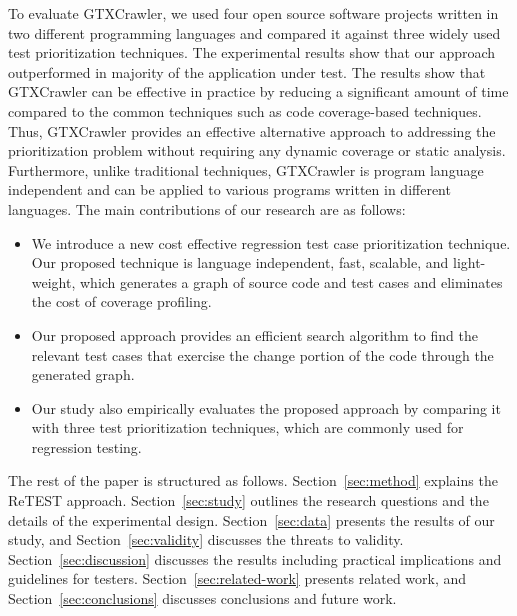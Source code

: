 







To evaluate GTXCrawler, we used four open source software projects
written in two different programming languages
and compared it against three widely used test prioritization techniques. 
The experimental results show that our approach outperformed 
in majority of the application under test.
The results show that GTXCrawler can be effective in practice
by reducing a significant amount of time compared to the common techniques
such as code coverage-based techniques.
Thus, GTXCrawler provides an effective alternative approach to 
addressing the prioritization problem
without requiring any dynamic coverage or static analysis. 
Furthermore, unlike traditional techniques, GTXCrawler
is program language independent and can be applied to various
programs written in different languages. 
The main contributions of our research are as follows:

\begin{itemize}
	
	\item We introduce a new cost effective regression test case
	prioritization technique.  
    Our proposed technique is language independent, fast, scalable, and light-weight, 
    which generates a graph of source code and test cases and
    eliminates the cost of coverage profiling. 

	\item Our proposed approach provides an efficient search 
	algorithm to find the relevant test cases that exercise the
	change portion of the code through the generated graph.
	
	\item Our study also empirically evaluates the proposed approach
	by comparing it with three test prioritization techniques,
	which are commonly used for regression testing. 
	
\end{itemize}

The rest of the paper is structured as follows. 
Section~\ref{sec:method}
explains the ReTEST approach. 
Section~\ref{sec:study} outlines the research questions and 
the details of the experimental design. 
Section~\ref{sec:data} presents the results of our study,
and Section~\ref{sec:validity} discusses the threats to validity. 
Section~\ref{sec:discussion} discusses the results including practical 
implications and guidelines for testers. Section~\ref{sec:related-work} 
presents related work, and Section~\ref{sec:conclusions} discusses 
conclusions and future work.






